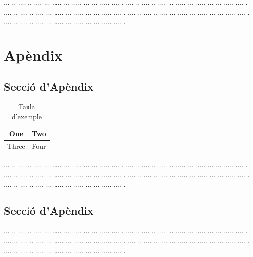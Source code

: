 \documentclass[10pt,a4paper,twocolumn,twoside]{article}
\begin{document}
... ..  .... .. .... ... ..... ... ..... ... ... ..... .... .
.... ..  .... .. .... ... ..... ... ..... ... ... ..... .... .
.... ..  .... .. .... ... ..... ... ..... ... ... ..... .... .
.... ..  .... .. .... ... ..... ... ..... ... ... ..... .... .
.... ..  .... .. .... ... ..... ... ..... ... ... ..... .... .










\appendix

\section*{Apèndix}

\setcounter{section}{1}

\subsection{Secció d'Apèndix}
\begin{table}[h]
\caption{Taula d'exemple}
\label{tab:senzilla}
\begin{center}
\begin{tabular}{|c|c|}
\hline
One & Two\\
\hline
Three & Four\\
\hline
\end{tabular}
\end{center}
\end{table}

... ..  .... .. .... ... ..... ... ..... ... ... ..... .... .
.... ..  .... .. .... ... ..... ... ..... ... ... ..... .... .
.... ..  .... .. .... ... ..... ... ..... ... ... ..... .... .
.... ..  .... .. .... ... ..... ... ..... ... ... ..... .... .
.... ..  .... .. .... ... ..... ... ..... ... ... ..... .... .

\subsection{Secció d'Apèndix}


... ..  .... .. .... ... ..... ... ..... ... ... ..... .... .
.... ..  .... .. .... ... ..... ... ..... ... ... ..... .... .
.... ..  .... .. .... ... ..... ... ..... ... ... ..... .... .
.... ..  .... .. .... ... ..... ... ..... ... ... ..... .... .
.... ..  .... .. .... ... ..... ... ..... ... ... ..... .... .
\end{document}
